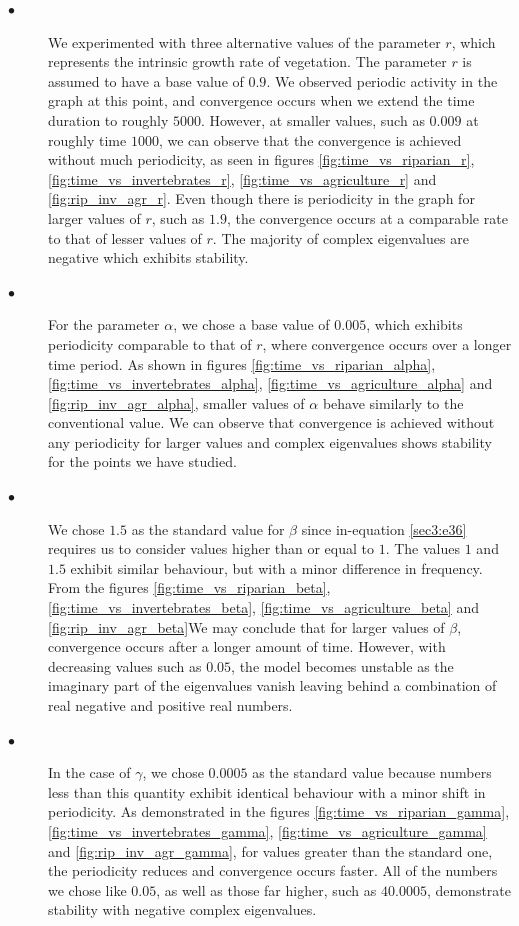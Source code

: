 \documentclass[12pt]{article}
\numberwithin{equation}{section}
\begin{document}
\begin{description}
\item[$\bullet$] We experimented with three alternative values of the parameter $r$, which represents the intrinsic growth rate of vegetation. The parameter $r$ is assumed to have a base value of $0.9$. We observed periodic activity in the graph at this point, and convergence occurs when we extend the time duration to roughly $5000$. However, at smaller values, such as $0.009$ at roughly time $1000$, we can observe that the convergence is achieved without much periodicity, as seen in figures \ref{fig:time_vs_riparian_r}, \ref{fig:time_vs_invertebrates_r}, \ref{fig:time_vs_agriculture_r} and \ref{fig:rip_inv_agr_r}. Even though there is periodicity in the graph for larger values of $r$, such as $1.9$, the convergence occurs at a comparable rate to that of lesser values of $r$. The majority of complex eigenvalues are negative which exhibits stability.\\
\item[$\bullet$] For the parameter $\alpha$, we chose a base value of $0.005$, which exhibits periodicity comparable to that of $r$, where convergence occurs over a longer time period. As shown in figures \ref{fig:time_vs_riparian_alpha}, \ref{fig:time_vs_invertebrates_alpha}, \ref{fig:time_vs_agriculture_alpha} and \ref{fig:rip_inv_agr_alpha}, smaller values of $\alpha$ behave similarly to the conventional value. We can observe that convergence is achieved without any periodicity for larger values and complex eigenvalues shows stability for the points we have studied.\\
\item[$\bullet$] We chose $1.5$ as the standard value for $\beta$ since in-equation \eqref{sec3:e36} requires us to consider values higher than or equal to $1$. The values $1$ and $1.5$ exhibit similar behaviour, but with a minor difference in frequency. From the figures \ref{fig:time_vs_riparian_beta}, \ref{fig:time_vs_invertebrates_beta}, \ref{fig:time_vs_agriculture_beta} and \ref{fig:rip_inv_agr_beta}We may conclude that for larger values of $\beta$, convergence occurs after a longer amount of time. However, with decreasing values such as $0.05$, the model becomes unstable as the imaginary part of the eigenvalues vanish leaving behind a combination of real negative and positive real numbers.\\
\item[$\bullet$] In the case of $\gamma$, we chose $0.0005$ as the standard value because numbers less than this quantity exhibit identical behaviour with a minor shift in periodicity. As demonstrated in the figures \ref{fig:time_vs_riparian_gamma}, \ref{fig:time_vs_invertebrates_gamma}, \ref{fig:time_vs_agriculture_gamma} and \ref{fig:rip_inv_agr_gamma}, for values greater than the standard one, the periodicity reduces and convergence occurs faster. All of the numbers we chose like $0.05$, as well as those far higher, such as $40.0005$, demonstrate stability with negative complex eigenvalues.\\

\end{description}
\end{document}
